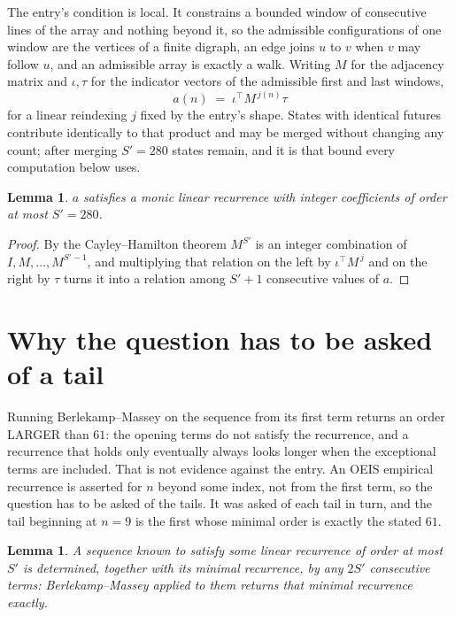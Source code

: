 \documentclass[11pt,a4paper]{article}
\theoremstyle{plain}
\newtheorem{lemma}[theorem]{Lemma}
\theoremstyle{definition}
\begin{document}
The entry's condition is local. It constrains a bounded window of consecutive lines of the
array and nothing beyond it, so the admissible configurations of one window are the vertices of
a finite digraph, an edge joins $u$ to $v$ when $v$ may follow $u$, and an admissible array is
exactly a walk. Writing $M$ for the adjacency matrix and $\iota,\tau$ for the indicator vectors
of the admissible first and last windows,
\[
a(n)\;=\;\iota^{\!\top}M^{\,j(n)}\tau
\]
for a linear reindexing $j$ fixed by the entry's shape. States with identical futures
contribute identically to that product and may be merged without changing any count; after
merging $S'=280$ states remain, and it is that bound every computation below uses.

\begin{lemma}\label{lem:cf}
$a$ satisfies a monic linear recurrence with integer coefficients of order at most $S'=280$.
\end{lemma}

\begin{proof}
By the Cayley--Hamilton theorem $M^{S'}$ is an integer combination of $I,M,\dots,M^{S'-1}$,
and multiplying that relation on the left by $\iota^{\!\top}M^{\,j}$ and on the right by
$\tau$ turns it into a relation among $S'+1$ consecutive values of $a$.
\end{proof}

\section{Why the question has to be asked of a tail}

Running Berlekamp--Massey on the sequence from its first term returns an order LARGER than $61$: the opening terms do not satisfy the recurrence, and a recurrence that holds only eventually always looks longer when the exceptional terms are included. That is not evidence against the entry. An OEIS empirical recurrence is asserted for $n$ beyond some index, not from the first term, so the question has to be asked of the tails. It was asked of each tail in turn, and the tail beginning at $n=9$ is the first whose minimal order is exactly the stated $61$.

\begin{lemma}\label{lem:bm}
A sequence known to satisfy some linear recurrence of order at most $S'$ is determined,
together with its minimal recurrence, by any $2S'$ consecutive terms: Berlekamp--Massey applied
to them returns that minimal recurrence exactly.
\end{lemma}
\end{document}
